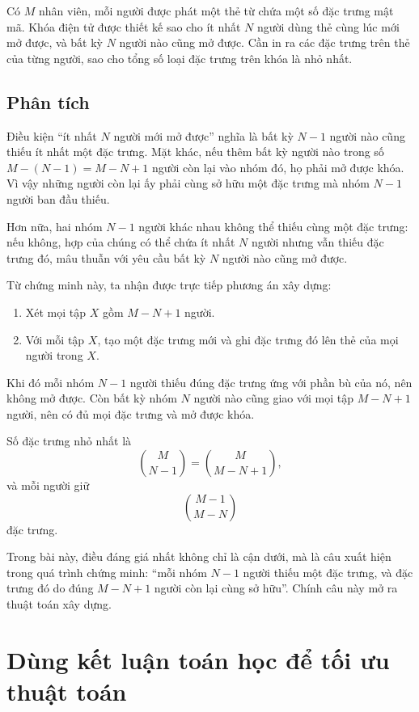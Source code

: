 \documentclass[11pt]{article}
\begin{document}
Có \(M\) nhân viên, mỗi người được phát một thẻ từ chứa một số đặc trưng mật
mã. Khóa điện tử được thiết kế sao cho ít nhất \(N\) người dùng thẻ cùng lúc
mới mở được, và bất kỳ \(N\) người nào cũng mở được. Cần in ra các đặc trưng
trên thẻ của từng người, sao cho tổng số loại đặc trưng trên khóa là nhỏ
nhất.

\subsection{Phân tích}

Điều kiện ``ít nhất \(N\) người mới mở được'' nghĩa là bất kỳ \(N-1\) người
nào cũng thiếu ít nhất một đặc trưng. Mặt khác, nếu thêm bất kỳ người nào
trong số \(M-(N-1)=M-N+1\) người còn lại vào nhóm đó, họ phải mở được khóa.
Vì vậy những người còn lại ấy phải cùng sở hữu một đặc trưng mà nhóm
\(N-1\) người ban đầu thiếu.

Hơn nữa, hai nhóm \(N-1\) người khác nhau không thể thiếu cùng một đặc trưng:
nếu không, hợp của chúng có thể chứa ít nhất \(N\) người nhưng vẫn thiếu đặc
trưng đó, mâu thuẫn với yêu cầu bất kỳ \(N\) người nào cũng mở được.

Từ chứng minh này, ta nhận được trực tiếp phương án xây dựng:

\begin{enumerate}
  \item Xét mọi tập \(X\) gồm \(M-N+1\) người.
  \item Với mỗi tập \(X\), tạo một đặc trưng mới và ghi đặc trưng đó lên thẻ
  của mọi người trong \(X\).
\end{enumerate}

Khi đó mỗi nhóm \(N-1\) người thiếu đúng đặc trưng ứng với phần bù của nó, nên
không mở được. Còn bất kỳ nhóm \(N\) người nào cũng giao với mọi tập
\(M-N+1\) người, nên có đủ mọi đặc trưng và mở được khóa.

Số đặc trưng nhỏ nhất là
\[
  \binom{M}{N-1}=\binom{M}{M-N+1},
\]
và mỗi người giữ
\[
  \binom{M-1}{M-N}
\]
đặc trưng.

Trong bài này, điều đáng giá nhất không chỉ là cận dưới, mà là câu xuất hiện
trong quá trình chứng minh: ``mỗi nhóm \(N-1\) người thiếu một đặc trưng, và
đặc trưng đó do đúng \(M-N+1\) người còn lại cùng sở hữu''. Chính câu này mở
ra thuật toán xây dựng.

\section{Dùng kết luận toán học để tối ưu thuật toán}
\end{document}
